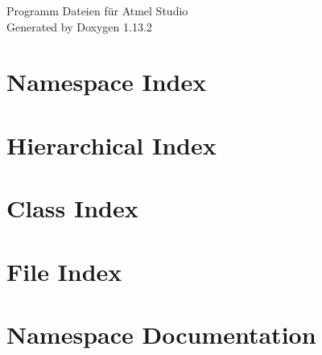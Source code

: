 \documentclass[twoside]{book}
\newcommand{\+}{\discretionary{\mbox{\scriptsize$\hookleftarrow$}}{}{}}
\newcommand{\clearemptydoublepage}{%
    \newpage{\pagestyle{empty}\cleardoublepage}%
  }
\begin{document}
  \raggedbottom
    \hypersetup{pageanchor=false,
                bookmarksnumbered=true,
                pdfencoding=unicode
               }
  \begin{titlepage}
  \vspace*{7cm}
  \begin{center}%
  {\Large Programm Dateien für Atmel Studio}\\
  \vspace*{1cm}
  {\large Generated by Doxygen 1.13.2}\\
  \end{center}
  \end{titlepage}
  \clearemptydoublepage
  \tableofcontents
  \clearemptydoublepage
  \hypersetup{pageanchor=true}



\chapter{Namespace Index}

\chapter{Hierarchical Index}

\chapter{Class Index}

\chapter{File Index}

\chapter{Namespace Documentation}

















\end{document}

